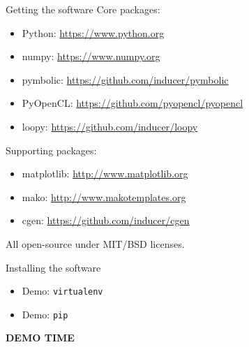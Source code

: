 \documentclass[english,compress]{beamer}
\def\bigncentered#1{
  \begin{center}
    \Huge\bfseries #1
  \end{center}
}
\begin{document}
\begin{frame}{Getting the software}
  Core packages:
  \begin{itemize}
    \item Python: \url{https://www.python.org}
    \item numpy: \url{https://www.numpy.org}
    \item pymbolic: \url{https://github.com/inducer/pymbolic}
    \item PyOpenCL: \url{https://github.com/pyopencl/pyopencl}
    \item loopy: \url{https://github.com/inducer/loopy}
  \end{itemize}
  Supporting packages:
  \begin{itemize}
    \item matplotlib: \url{http://www.matplotlib.org}
    \item mako: \url{http://www.makotemplates.org}
    \item cgen: \url{https://github.com/inducer/cgen}
  \end{itemize}
  All open-source under MIT/BSD licenses.
\end{frame}
\begin{frame}{Installing the software}
  \begin{itemize}
    \item Demo: \texttt{virtualenv}
    \item Demo: \texttt{pip}
  \end{itemize}
\end{frame}
\begin{frame}
  \bigncentered{DEMO TIME}
\end{frame}
\end{document}
